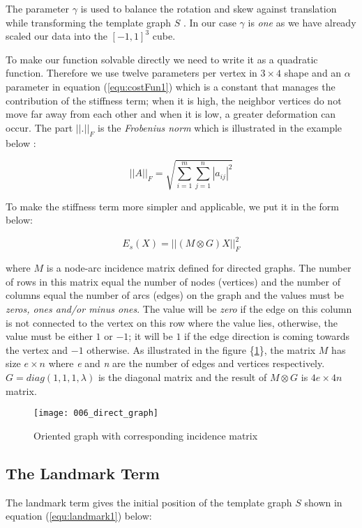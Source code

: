 \documentclass[../structure.tex]{subfiles}
\begin{document}
The parameter $\gamma$ is used to balance the rotation and skew against translation while transforming the template graph $S$ \cite{Amberg2007}. In our case $\gamma$ is \textit{one} as we have already scaled our data into the $[-1, 1]^3$ cube.

To make our function solvable directly we need to write it as a quadratic function. Therefore we use twelve parameters per vertex in $3 \times 4$ shape and an $\alpha$ parameter in equation (\ref{equ:costFun1}) which is a constant that manages the contribution of the stiffness term; when it is high, the neighbor vertices do not move far away from each other and when it is low, a greater deformation can occur.
The part $||.||_{F}$ is the \textit{Frobenius norm} which is illustrated in the example below \cite{Amberg2007}:

\begin{equation*}
||A||_{F} = \sqrt{\sum_{i=1}^m \sum_{j=1}^n |a_{ij}|^2}
\end{equation*}

To make the stiffness term more simpler and applicable, we put it in the form below:

\begin{equation}
E_{s}(X) = ||(M\otimes G)X||_{F}^2
\end{equation}

where $M$ is a node-arc incidence matrix defined for directed graphs. The number of rows in this matrix equal the number of nodes (vertices) and the number of columns equal the number of arcs (edges) on the graph and the values must be \textit{zeros, ones and/or minus ones}. The value will be \textit{zero} if the edge on this column is not connected to the vertex on this row where the value lies, otherwise, the value must be either $1$ or $-1$; it will be $1$ if the edge direction is coming towards the vertex and $-1$ otherwise. As illustrated in the figure \{\ref{fig:directed_graph}\}, the matrix $M$ has size $e\times n$ where \textit{e} and \textit{n} are the number of edges and vertices respectively. $G = diag(1,1,1,\lambda)$ is the diagonal matrix and the result of $M \otimes G$ is $4e \times 4n$ matrix.


\begin{figure}[h!]
\centering
\texttt{[image: 006\_direct\_graph]}
\captionsetup{justification=centering}
\caption{Oriented graph with corresponding incidence matrix  \cite{Wikipedia2010}}
\label{fig:directed_graph}
\end{figure}

\subsection{The Landmark Term}
\hspace{2em}The landmark term gives the initial position of the template graph $S$ shown in equation (\ref{equ:landmark1}) below:
\end{document}
